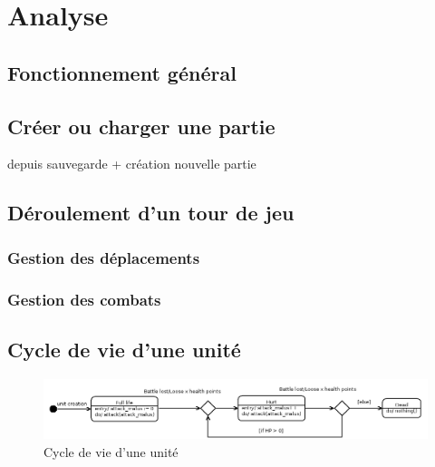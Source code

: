 \section{Analyse}

\subsection{Fonctionnement général}

\subsection{Créer ou charger une partie}
depuis sauvegarde + création nouvelle partie

\subsection{Déroulement d'un tour de jeu}
\subsubsection{Gestion des déplacements}
\subsubsection{Gestion des combats}

\subsection{Cycle de vie d'une unité}

\begin{figure}[!h] 
\includegraphics[width=13cm]{schemas/state-diagram.png} 
\caption{Cycle de vie d'une unité} 
\label{uc-unit}
\end{figure} 

